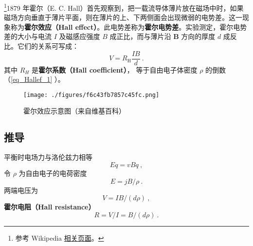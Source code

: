 
\begin{issues}
\issueDraft
\end{issues}

\footnote{参考 Wikipedia \href{https://en.wikipedia.org/wiki/Hall_effect}{相关页面}。}1879 年霍尔（E. C. Hall）首先观察到，把一载流导体薄片放在磁场中时，如果磁场方向垂直于薄片平面，则在薄片的上、下两侧面会出现微弱的电势差。这一现象称为\textbf{霍尔效应（Hall effect）}。此电势差称为\textbf{霍尔电势差}。实验测定，霍尔电势差的大小与电流 $I$ 及磁感应强度 $B$ 成正比，而与薄片沿 $\mathbf B$ 方向的厚度 $d$ 成反比。它们的关系可写成：
\begin{equation}
V = R_{\mathrm{H}} \frac{I B}{d}~.
\end{equation}
其中 $R_H$ 是\textbf{霍尔系数（Hall coefficient）}， 等于自由电子体密度 $\rho$ 的倒数（\autoref{eq_Hallef_1} ）。

\begin{figure}[ht]
\centering
\texttt{[image: ./figures/f6c43fb7857c45fc.png]}
\caption{霍尔效应示意图（来自维基百科）} \label{fig_Hallef_1}
\end{figure}

\subsection{推导}
平衡时电场力与洛伦兹力相等
\begin{equation}
Eq = vBq~,
\end{equation}
令 $\rho$ 为自由电子的电荷密度
\begin{equation}
E = jB/\rho~.
\end{equation}
两端电压为
\begin{equation}\label{eq_Hallef_1}
V = IB/(d\rho)~,
\end{equation}
\textbf{霍尔电阻（Hall resistance）}
\begin{equation}
R = V/I = B/(d\rho)~.
\end{equation}
